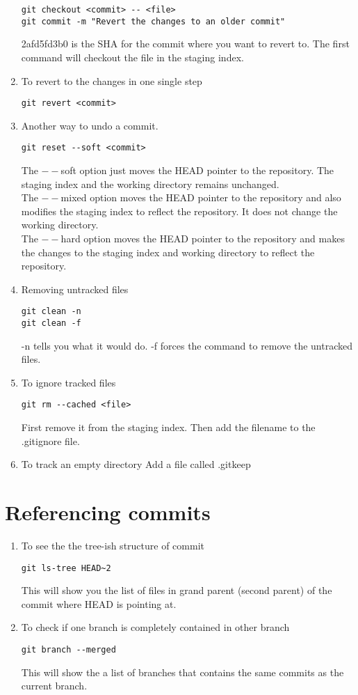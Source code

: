 \documentclass[paper=a4, fontsize=12pt]{scrartcl}
\begin{document}
\begin{enumerate}
\begin{lstlisting}
git checkout <commit> -- <file>
git commit -m "Revert the changes to an older commit"
\end{lstlisting}
2afd5fd3b0 is the SHA for the commit where you want to revert to. The first command will checkout the file in the staging index.
\item To revert to the changes in one single step
\begin{lstlisting}
git revert <commit>
\end{lstlisting}
\item Another way to undo a commit.
\begin{lstlisting}
git reset --soft <commit> 
\end{lstlisting}
The $--$soft option just moves the HEAD pointer to the repository. The staging index and the working directory remains unchanged.\\
The $--$mixed option moves the HEAD pointer to the repository and also modifies the staging index to reflect the repository. It does not change the working directory.\\
The $--$hard option moves the HEAD pointer to the repository and makes the changes to the staging index and working directory to reflect the repository.
\item Removing untracked files
\begin{lstlisting}
git clean -n
git clean -f
\end{lstlisting}
-n tells you what it would do.
-f forces the command to remove the untracked files.
\item To ignore tracked files
\begin{lstlisting}
git rm --cached <file>
\end{lstlisting}
First remove it from the staging index. Then add the filename to the .gitignore file.
\item To track an empty directory
Add a file called .gitkeep
\end{enumerate}

\section*{Referencing commits}
\begin{enumerate}
\item To see the the tree-ish structure of commit
\begin{lstlisting}
git ls-tree HEAD~2
\end{lstlisting}
This will show you the list of files in grand parent (second parent) of the commit where HEAD is pointing at.
\item To check if one branch is completely contained in other branch
\begin{lstlisting}
git branch --merged
\end{lstlisting}
This will show the a list of branches that contains the same commits as the current branch.
\end{enumerate}
\end{document}
